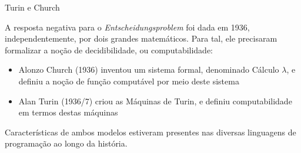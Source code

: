\begin{frame}[fragile]{Turin e Church}

    A resposta negativa para o \textit{Entscheidungsproblem} foi dada em 1936, independentemente,
    por dois grandes matemáticos. Para tal, ele precisaram formalizar a noção de 
    decidibilidade, ou computabilidade:

    \vspace{0.2in}

    \begin{itemize}
        \item Alonzo Church (1936) inventou um sistema formal, denominado Cálculo $\lambda$,
            e definiu a noção de função computável por meio deste sistema
        \item Alan Turin (1936/7) criou as Máquinas de Turin, e definiu computabilidade em termos
            destas máquinas
    \end{itemize}

    \vspace{0.2in}

    Características de ambos modelos estiveram presentes nas diversas linguagens de programação
    ao longo da história.

\end{frame}
